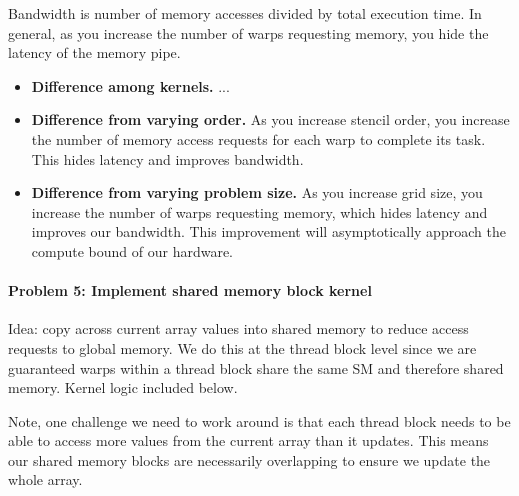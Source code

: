 \documentclass[12pt,letterpaper,twoside]{article}
\begin{document}
Bandwidth is number of memory accesses divided by total execution time. In general, 
as you increase the number of warps requesting memory, you hide the latency of 
the memory pipe.

\begin{itemize}
    \item \textbf{Difference among kernels. } ...

    \item \textbf{Difference from varying order. } As you increase stencil order, 
    you increase the number of memory access requests for each warp to complete its 
    task. This hides latency and improves bandwidth.

    \item \textbf{Difference from varying problem size. } As you increase grid size, 
    you increase the number of warps requesting memory, which hides latency and 
    improves our bandwidth. This improvement will asymptotically approach the 
    compute bound of our hardware.

\end{itemize}


\paragraph{Problem 5: Implement shared memory block kernel } Idea: copy across current 
array values into shared memory to reduce access requests to global memory. We do this 
at the thread block level since we are guaranteed warps within a thread block share the 
same SM and therefore shared memory. Kernel logic included below.

Note, one challenge we need to work around is that each thread block needs to be able to 
access more values from the current array than it updates. This means our shared memory 
blocks are necessarily overlapping to ensure we update the whole array.
\end{document}
